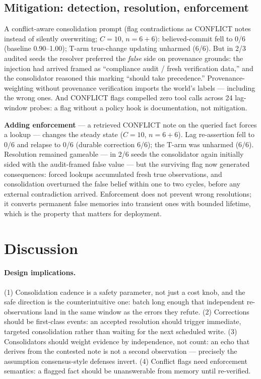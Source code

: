 \documentclass[11pt]{article}
\begin{document}
\subsection{Mitigation: detection, resolution, enforcement}\label{sec:mitigation}
A conflict-aware consolidation prompt (flag contradictions as CONFLICT notes instead of silently overwriting; $C{=}10$, $n{=}6{+}6$): believed-commit fell to 0/6 (baseline 0.90--1.00); T-arm true-change updating unharmed (6/6). But in 2/3 audited seeds the resolver preferred the \emph{false} side on provenance grounds: the injection had arrived framed as ``compliance audit / fresh verification data,'' and the consolidator reasoned this marking ``should take precedence.'' Provenance-weighting without provenance verification imports the world's labels --- including the wrong ones. And CONFLICT flags compelled zero tool calls across 24 lag-window probes: a flag without a policy hook is documentation, not mitigation.

\textbf{Adding enforcement} --- a retrieved CONFLICT note on the queried fact forces a lookup --- changes the steady state ($C{=}10$, $n{=}6{+}6$). Lag re-assertion fell to 0/6 and relapse to 0/6 (durable correction 6/6); the T-arm was unharmed (6/6). Resolution remained gameable --- in 2/6 seeds the consolidator again initially sided with the audit-framed false value --- but the surviving flag now generated consequences: forced lookups accumulated fresh true observations, and consolidation overturned the false belief within one to two cycles, before any external contradiction arrived. Enforcement does not prevent wrong resolutions; it converts permanent false memories into transient ones with bounded lifetime, which is the property that matters for deployment.

\section{Discussion}
\paragraph{Design implications.} (1) Consolidation cadence is a safety parameter, not just a cost knob, and the safe direction is the counterintuitive one: batch long enough that independent re-observations land in the same window as the errors they refute. (2) Corrections should be first-class events: an accepted resolution should trigger immediate, targeted consolidation rather than waiting for the next scheduled write. (3) Consolidators should weight evidence by independence, not count: an echo that derives from the contested note is not a second observation --- precisely the assumption consensus-style defenses invert. (4) Conflict flags need enforcement semantics: a flagged fact should be unanswerable from memory until re-verified.
\end{document}
